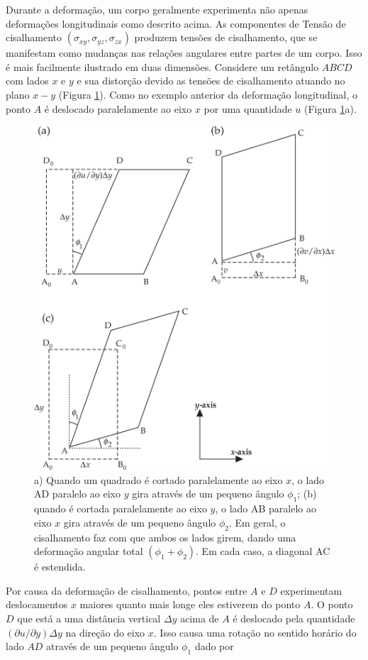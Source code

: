 \documentclass[]{book}
\theoremstyle{definition}
\theoremstyle{definition}
\theoremstyle{definition}
\theoremstyle{remark}
\begin{document}
Durante a deformação, um corpo geralmente experimenta não apenas deformações longitudinais como descrito acima. As componentes de Tensão de cisalhamento \((\sigma_{xy}, \sigma_{yz}, \sigma_{zx})\) produzem tensões de cisalhamento, que se manifestam como mudanças nas relações angulares entre partes de um corpo. Isso é mais facilmente ilustrado em duas dimensões. Considere um retângulo \(ABCD\) com lados \(x\) e \(y\) e sua distorção devido as tensões de cisalhamento atuando no plano \(x-y\) (Figura \ref{fig:quadrado}). Como no exemplo anterior da deformação longitudinal, o ponto \(A\) é deslocado paralelamente ao eixo \(x\) por uma quantidade \(u\) (Figura \ref{fig:quadrado}a).

\begin{figure}

{\centering \includegraphics[width=0.7\linewidth]{fig/Fig_03.06} 

}

\caption{a) Quando um quadrado é cortado paralelamente ao eixo $x$, o lado AD paralelo ao eixo $y$ gira através de um pequeno ângulo $\phi_1$; (b) quando é cortada paralelamente ao eixo $y$, o lado AB paralelo ao eixo $x$ gira através de um pequeno ângulo $\phi_2$. Em geral, o cisalhamento faz com que ambos os lados girem, dando uma deformação angular total $(\phi_1 + \phi_2)$. Em cada caso, a diagonal AC é estendida.}\label{fig:quadrado}
\end{figure}

Por causa da deformação de cisalhamento, pontos entre \(A\) e \(D\) experimentam deslocamentos \(x\) maiores quanto mais longe eles estiverem do ponto \(A\). O ponto \(D\) que está a uma distância vertical \(\Delta{y}\) acima de \(A\) é deslocado pela quantidade \((\partial u / \partial y)\Delta{y}\) na direção do eixo \(x\). Isso causa uma rotação no sentido horário do lado \(AD\) através de um pequeno ângulo \(\phi_{1}\) dado por
\end{document}
